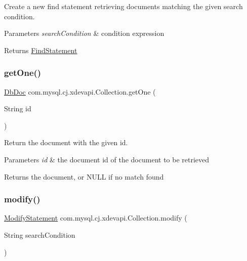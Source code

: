 Create a new find statement retrieving documents matching the given search condition.


\begin{DoxyParams}{Parameters}
{\em search\+Condition} & condition expression \\
\hline
\end{DoxyParams}
\begin{DoxyReturn}{Returns}
\mbox{\hyperlink{interfacecom_1_1mysql_1_1cj_1_1xdevapi_1_1_find_statement}{Find\+Statement}} 
\end{DoxyReturn}
\mbox{\label{interfacecom_1_1mysql_1_1cj_1_1xdevapi_1_1_collection_afbb44f5ae7c315f07d02a22abfc5a204}} 
\subsubsection{\texorpdfstring{get\+One()}{getOne()}}
{\footnotesize\ttfamily \mbox{\hyperlink{interfacecom_1_1mysql_1_1cj_1_1xdevapi_1_1_db_doc}{Db\+Doc}} com.\+mysql.\+cj.\+xdevapi.\+Collection.\+get\+One (\begin{DoxyParamCaption}\item[{String}]{id }\end{DoxyParamCaption})}

Return the document with the given id.


\begin{DoxyParams}{Parameters}
{\em id} & the document id of the document to be retrieved \\
\hline
\end{DoxyParams}
\begin{DoxyReturn}{Returns}
the document, or N\+U\+LL if no match found 
\end{DoxyReturn}
\mbox{\label{interfacecom_1_1mysql_1_1cj_1_1xdevapi_1_1_collection_ad98b2d273d43ca6a029979c82e2d250a}} 
\subsubsection{\texorpdfstring{modify()}{modify()}}
{\footnotesize\ttfamily \mbox{\hyperlink{interfacecom_1_1mysql_1_1cj_1_1xdevapi_1_1_modify_statement}{Modify\+Statement}} com.\+mysql.\+cj.\+xdevapi.\+Collection.\+modify (\begin{DoxyParamCaption}\item[{String}]{search\+Condition }\end{DoxyParamCaption})}

